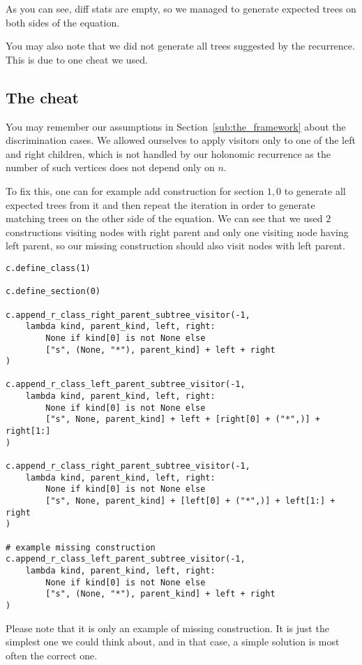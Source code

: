 \documentclass[final]{article}
\theoremstyle{definition}
\theoremstyle{definition}
\theoremstyle{remark}
\begin{document}
As you can see, diff stats are empty, so we managed to generate expected trees on both sides of the equation.

You may also note that we did not generate all trees suggested by the recurrence. This is due to one cheat we used.

\subsection{The cheat}%
\label{sub:the_cheat}

You may remember our assumptions in Section~\ref{sub:the_framework} about the discrimination cases. We allowed ourselves to apply visitors only to one of the left and right children, which is not handled by our holonomic recurrence as the number of such vertices does not depend only on \(n\).

To fix this, one can for example add construction for section \(1, 0\) to generate all expected trees from it and then repeat the iteration in order to generate matching trees on the other side of the equation. We can see that we used \(2\) constructions visiting nodes with right parent and only one visiting node having left parent, so our missing construction should also visit nodes with left parent.

\begin{lstlisting}
c.define_class(1)

c.define_section(0)

c.append_r_class_right_parent_subtree_visitor(-1,
    lambda kind, parent_kind, left, right:
        None if kind[0] is not None else
        ["s", (None, "*"), parent_kind] + left + right
)

c.append_r_class_left_parent_subtree_visitor(-1,
    lambda kind, parent_kind, left, right:
        None if kind[0] is not None else
        ["s", None, parent_kind] + left + [right[0] + ("*",)] + right[1:]
)

c.append_r_class_right_parent_subtree_visitor(-1,
    lambda kind, parent_kind, left, right:
        None if kind[0] is not None else
        ["s", None, parent_kind] + [left[0] + ("*",)] + left[1:] + right
)

# example missing construction
c.append_r_class_left_parent_subtree_visitor(-1,
    lambda kind, parent_kind, left, right:
        None if kind[0] is not None else
        ["s", (None, "*"), parent_kind] + left + right
)
\end{lstlisting}

Please note that it is only an example of missing construction. It is just the simplest one we could think about, and in that case, a simple solution is most often the correct one.
\end{document}
